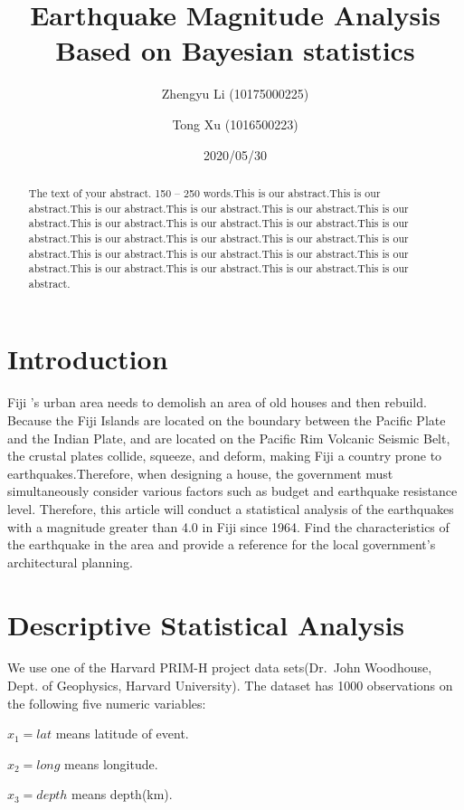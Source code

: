 \documentclass[]{article}
\title{Earthquake Magnitude Analysis Based on Bayesian statistics}
\author{Zhengyu Li (10175000225) \and Tong Xu (1016500223)}
\date{2020/05/30}
\begin{document}
\maketitle

{
\setcounter{tocdepth}{2}
\tableofcontents
}
\begin{abstract}
The text of your abstract.  150 -- 250 words.This is our abstract.This is our abstract.This is our abstract.This is our abstract.This is our abstract.This is our abstract.This is our abstract.This is our abstract.This is our abstract.This is our abstract.This is our abstract.This is our abstract.This is our abstract.This is our abstract.This is our abstract.This is our abstract.This is our abstract.This is our abstract.This is our abstract.This is our abstract.This is our abstract.This is our abstract.
\end{abstract}

\section{Introduction}\label{intro}

Fiji 's urban area needs to demolish an area of old houses and then
rebuild. Because the Fiji Islands are located on the boundary between
the Pacific Plate and the Indian Plate, and are located on the Pacific
Rim Volcanic Seismic Belt, the crustal plates collide, squeeze, and
deform, making Fiji a country prone to earthquakes.Therefore, when
designing a house, the government must simultaneously consider various
factors such as budget and earthquake resistance level. Therefore, this
article will conduct a statistical analysis of the earthquakes with a
magnitude greater than 4.0 in Fiji since 1964. Find the characteristics
of the earthquake in the area and provide a reference for the local
government's architectural planning.

\section{Descriptive Statistical Analysis}\label{sec:1}

We use one of the Harvard PRIM-H project data sets(Dr.~John Woodhouse,
Dept. of Geophysics, Harvard University). The dataset has 1000
observations on the following five numeric variables:

\(x_1 = lat\) means latitude of event.

\(x_2 = long\) means longitude.

\(x_3 = depth\) means depth(km).
\end{document}
